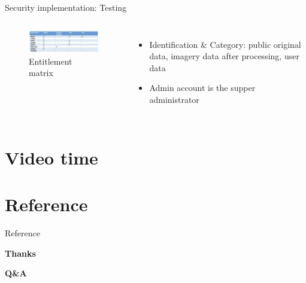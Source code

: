 \documentclass[aspectratio=169]{beamer}
\begin{document}
\begin{frame}[fragile]{Security implementation: Testing}

  \begin{columns}
      \begin{figure}[htbp]
        \centerline{\includegraphics[width=180pt]{images/matrix.png}}
        \caption{Entitlement matrix}
      \end{figure}

      \begin{itemize}
        \item Identification \& Category: public original data, imagery data after processing, user data
        \pause
        \item Admin account is the supper administrator
        
      \end{itemize}
  \end{columns}

\end{frame}

\section{Video time}

\section{Reference}

\begin{frame}[allowframebreaks]{Reference}

   \printbibliography[heading=none]
 
\end{frame}

\begin{frame}{}
  \textbf{Thanks}

  \textbf{Q\&A}
\end{frame}
\end{document}
